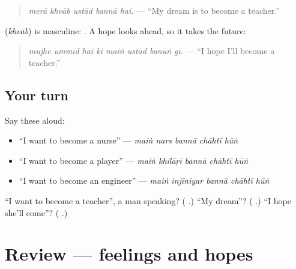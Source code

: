 \begin{quote}
\emph{merā khvāb ustād bannā hai.} — \textquotedblleft{}My dream is to become a teacher.\textquotedblright{}
\end{quote}

\textbf{} (\emph{khvāb}) is masculine: \textbf{}. A hope looks ahead, so it takes the future:

\begin{quote}
\textbf{       }
\end{quote}

\begin{quote}
\emph{mujhe ummīd hai ki maiṅ ustād banūṅ gī.} — \textquotedblleft{}I hope I'll become a teacher.\textquotedblright{}
\end{quote}

\subsection*{Your turn}
Say these aloud:

\begin{itemize}
\raggedright
  \item \textquotedblleft{}I want to become a nurse\textquotedblright{} — \emph{maiṅ nars bannā chāhtī hūṅ}
  \item \textquotedblleft{}I want to become a player\textquotedblright{} — \emph{maiṅ khilāṛī bannā chāhtī hūṅ}
  \item \textquotedblleft{}I want to become an engineer\textquotedblright{} — \emph{maiṅ injīniyar bannā chāhtī hūṅ}
\end{itemize}

\begin{tcolorbox}[breakable,colback=teal!4,colframe=teal!35!black,title={Before you move on}]
\textquotedblleft{}I want to become a teacher\textquotedblright{}, a man speaking? (\textbf{    }.) \textquotedblleft{}My dream\textquotedblright{}? (\textbf{ }.) \textquotedblleft{}I hope she'll come\textquotedblright{}? (\textbf{      }.)
\end{tcolorbox}
\section[(review)]{Review — feelings and hopes}

\label{lesson:UR-R272-feelings-and-hopes}



